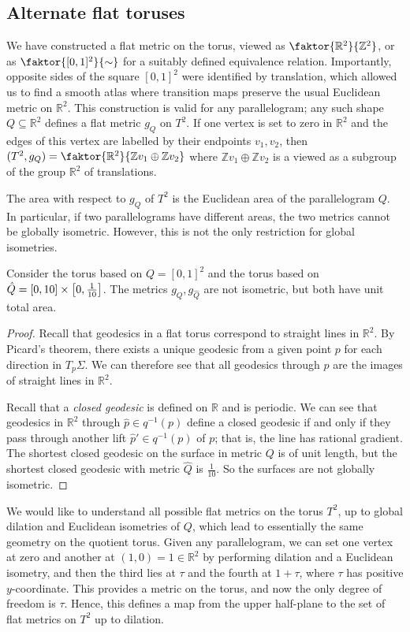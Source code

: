 \subsection{Alternate flat toruses}
We have constructed a flat metric on the torus, viewed as \( \faktor{\mathbb R^2}{\mathbb Z^2} \), or as \( \faktor{[0,1]^2}{\sim} \) for a suitably defined equivalence relation.
Importantly, opposite sides of the square \( [0,1]^2 \) were identified by translation, which allowed us to find a smooth atlas where transition maps preserve the usual Euclidean metric on \( \mathbb R^2 \).
This construction is valid for any parallelogram; any such shape \( Q \subseteq \mathbb R^2 \) defines a flat metric \( g_Q \) on \( T^2 \).
If one vertex is set to zero in \( \mathbb R^2 \) and the edges of this vertex are labelled by their endpoints \( v_1, v_2 \), then \( (T^2, g_Q) = \faktor{\mathbb R^2}{\mathbb Z v_1 \oplus \mathbb Z v_2} \) where \( \mathbb Z v_1 \oplus \mathbb Z v_2 \) is a viewed as a subgroup of the group \( \mathbb R^2 \) of translations.

The area with respect to \( g_Q \) of \( T^2 \) is the Euclidean area of the parallelogram \( Q \).
In particular, if two parallelograms have different areas, the two metrics cannot be globally isometric.
However, this is not the only restriction for global isometries.
\begin{lemma}
	Consider the torus based on \( Q = [0,1]^2 \) and the torus based on \( \hat Q = [0,10] \times \qty[0,\frac{1}{10}] \).
	The metrics \( g_Q, g_{\hat Q} \) are not isometric, but both have unit total area.
\end{lemma}
\begin{proof}
	Recall that geodesics in a flat torus correspond to straight lines in \( \mathbb R^2 \).
	By Picard's theorem, there exists a unique geodesic from a given point \( p \) for each direction in \( T_p \Sigma \).
	We can therefore see that all geodesics through \( p \) are the images of straight lines in \( \mathbb R^2 \).

	Recall that a \textit{closed geodesic} is defined on \( \mathbb R \) and is periodic.
	We can see that geodesics in \( \mathbb R^2 \) through \( \hat p \in q^{-1}(p) \) define a closed geodesic if and only if they pass through another lift \( \hat p' \in q^{-1}(p) \) of \( p \); that is, the line has rational gradient.
	The shortest closed geodesic on the surface in metric \( Q \) is of unit length, but the shortest closed geodesic with metric \( \hat Q \) is \( \frac{1}{10} \).
	So the surfaces are not globally isometric.
\end{proof}
We would like to understand all possible flat metrics on the torus \( T^2 \), up to global dilation and Euclidean isometries of \( Q \), which lead to essentially the same geometry on the quotient torus.
Given any parallelogram, we can set one vertex at zero and another at \( (1,0) = 1 \in \mathbb R^2 \) by performing dilation and a Euclidean isometry, and then the third lies at \( \tau \) and the fourth at \( 1 + \tau \), where \( \tau \) has positive \( y \)-coordinate.
This provides a metric on the torus, and now the only degree of freedom is \( \tau \).
Hence, this defines a map from the upper half-plane to the set of flat metrics on \( T^2 \) up to dilation.

